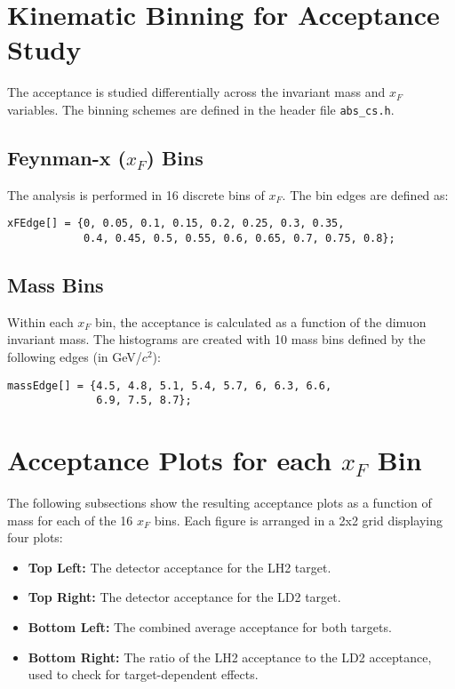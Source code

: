 \documentclass{article}
\begin{document}
\section{Kinematic Binning for Acceptance Study}
The acceptance is studied differentially across the invariant mass and $x_F$ variables. The binning schemes are defined in the header file \texttt{abs\_cs.h}.

\subsection{Feynman-x ($x_F$) Bins}
The analysis is performed in 16 discrete bins of $x_F$. The bin edges are defined as:
\begin{verbatim}
xFEdge[] = {0, 0.05, 0.1, 0.15, 0.2, 0.25, 0.3, 0.35,
            0.4, 0.45, 0.5, 0.55, 0.6, 0.65, 0.7, 0.75, 0.8};
\end{verbatim}

\subsection{Mass Bins}
Within each $x_F$ bin, the acceptance is calculated as a function of the dimuon invariant mass. The histograms are created with 10 mass bins defined by the following edges (in GeV/$c^2$):
\begin{verbatim}
massEdge[] = {4.5, 4.8, 5.1, 5.4, 5.7, 6, 6.3, 6.6,
              6.9, 7.5, 8.7};
\end{verbatim}

\section{Acceptance Plots for each $x_F$ Bin}
The following subsections show the resulting acceptance plots as a function of mass for each of the 16 $x_F$ bins. Each figure is arranged in a 2x2 grid displaying four plots:
\begin{itemize}
    \item \textbf{Top Left:} The detector acceptance for the LH2 target.
    \item \textbf{Top Right:} The detector acceptance for the LD2 target.
    \item \textbf{Bottom Left:} The combined average acceptance for both targets.
    \item \textbf{Bottom Right:} The ratio of the LH2 acceptance to the LD2 acceptance, used to check for target-dependent effects.
\end{itemize}
\end{document}
